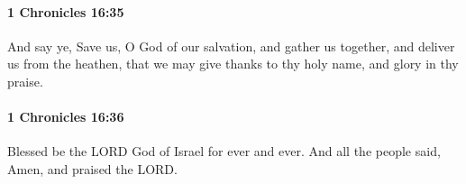 		\paragraph{1 Chronicles 16:35} %
			\label{1CHRONICLES-16-35}

			And say ye, Save us, O God of our salvation, and gather us together, and deliver us from the heathen, that we may give thanks to thy holy name, and glory in thy praise.


		\paragraph{1 Chronicles 16:36} %
			\label{1CHRONICLES-16-36}

			Blessed be the LORD God of Israel for ever and ever. And all the people said, Amen, and praised the LORD.


